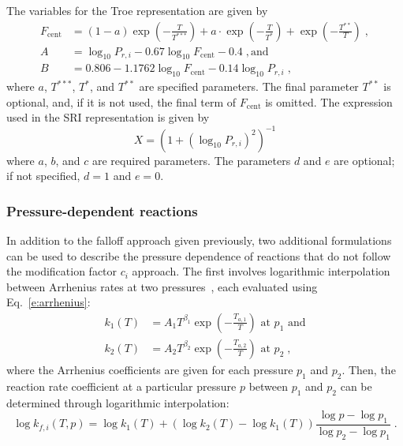 \documentclass[preprint,12pt]{elsarticle}
\begin{document}
The variables for the Troe representation are given by
\begin{align}
F_{\text{cent}} &= (1 - a) \exp \left( -\frac{T}{T^{***}} \right) + a\cdot \exp \left( -\frac{T}{T^*} \right) + \exp \left( -\frac{T^{**}}{T} \right) \;, \\
A &= \log_{10} P_{r,i} - 0.67 \log_{10} F_{\text{cent}} - 0.4 \;, \text{and} \\
B &= 0.806 - 1.1762 \log_{10} F_{\text{cent}} - 0.14 \log_{10} P_{r,i} \;,
\end{align}
where $a$, $T^{***}$, $T^*$, and $T^{**}$ are specified parameters.
The final parameter $T^{**}$ is optional, and, if it is not used, the final term of $F_{\text{cent}}$ is omitted.
The expression used in the SRI representation is given by
\begin{equation}
X = \left( 1 + \left( \log_{10} P_{r,i} \right)^2 \right)^{-1}
\end{equation}
where $a$, $b$, and $c$ are required parameters.
The parameters $d$ and $e$ are optional; if not specified, $d = 1$ and $e = 0$.

\subsubsection{Pressure-dependent reactions}

In addition to the falloff approach given previously, two additional formulations can be used to describe the pressure dependence of reactions that do not follow the modification factor $c_i$ approach.
The first involves logarithmic interpolation between Arrhenius rates at two pressures~\cite{chemkin:2012,Goodwin:2015aa}, each evaluated using Eq.~\eqref{e:arrhenius}:
\begin{align}
k_1 (T) &= A_1 T^{\beta_1} \exp \left( -\frac{T_{a, 1}}{T} \right) \text{ at } p_1 \text{ and} \label{e:plog_k1} \\
k_2 (T) &= A_2 T^{\beta_2} \exp \left( -\frac{T_{a, 2}}{T} \right) \text{ at } p_2 \;, \label{e:plog_k2}
\end{align}
where the Arrhenius coefficients are given for each pressure $p_1$ and $p_2$.
Then, the reaction rate coefficient at a particular pressure $p$ between $p_1$ and $p_2$ can be determined through logarithmic interpolation:
\begin{equation}
\log k_{f,i}(T, p) = \log k_1 (T) + \left( \log k_2 (T) - \log k_1 (T) \right) \frac{\log p - \log p_1}{\log p_2 - \log p_1} \;. \label{e:plog}
\end{equation}
\end{document}
